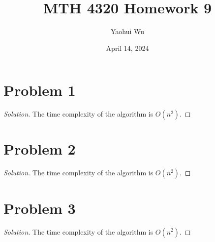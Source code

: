 \documentclass[12pt]{article}
\title{MTH 4320 Homework 9}
\author{Yaohui Wu}
\date{April 14, 2024}
\newenvironment*{solution}{\begin{proof}[Solution]}{\end{proof}}
\begin{document}
\maketitle
\section*{Problem 1}
\begin{solution}
    The time complexity of the algorithm is \(O(n^2)\).
\end{solution}
\section*{Problem 2}
\begin{solution}
    The time complexity of the algorithm is \(O(n^2)\).
\end{solution}
\section*{Problem 3}
\begin{solution}
    The time complexity of the algorithm is \(O(n^2)\).
\end{solution}
\end{document}
